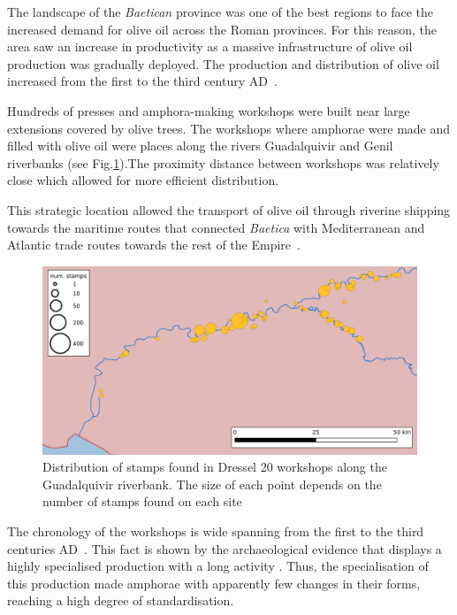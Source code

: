 The landscape of the \textit{Baetican} province was one of the best regions to face the increased demand for olive oil across the Roman provinces. For this reason, the area saw an increase in productivity as a massive infrastructure of olive oil production was gradually deployed. The production and distribution of olive oil increased from the first to the third century AD~\citep{remesal_concierto}. 


Hundreds of presses and amphora-making workshops were built near large extensions covered by olive trees. The workshops where amphorae were made and filled with olive oil were places along the rivers Guadalquivir and Genil riverbanks (see Fig.\ref{workshop}).The proximity distance between workshops was relatively close which allowed for more efficient distribution.

This strategic location allowed the transport of olive oil through riverine shipping towards the maritime routes that connected \textit{Baetica} with Mediterranean and Atlantic trade routes towards the rest of the Empire~\citep{garcia_vargas_enrique_formal_2010}.

\begin{figure}[htp]
	\centering
\includegraphics[width=\linewidth]{baetica}
\caption{Distribution of stamps found in Dressel 20 workshops along the Guadalquivir riverbank. The size of each point depends on the number of stamps found on each site}

\label{workshop}
\end{figure} 


The chronology of the workshops is wide spanning from the first to the third centuries AD~\citep{millet_anforas_1998,rodriguez_baetican_1998,chic2005comercio}. 
This fact is shown by the archaeological evidence that displays a highly specialised production with a long activity \citep{remesal_anforas_2004}. Thus, the specialisation of this production made amphorae with apparently few changes in their forms, reaching a high degree of standardisation. 

